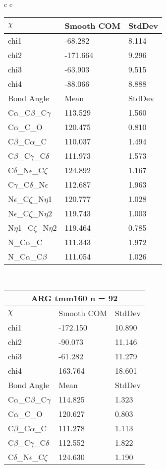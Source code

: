 \begin{longtable}{ c c }
\begin{tabular}{ l l l }
  $\chi$       & Smooth COM & StdDev \\ \midrule
  chi1 & -68.282 & 8.114 \\ 
  chi2 & -171.664 & 9.296 \\ 
  chi3 & -63.903 & 9.515 \\ 
  chi4 & -88.066 & 8.888 \\ \midrule
  Bond Angle   & Mean     & StdDev \\ \midrule
  C$\alpha$\_C$\beta$\_C$\gamma$ & 113.529 & 1.560\\
  C$\alpha$\_C\_O & 120.475 & 0.810\\
  C$\beta$\_C$\alpha$\_C & 110.037 & 1.494\\
  C$\beta$\_C$\gamma$\_C$\delta$ & 111.973 & 1.573\\
  C$\delta$\_N$\epsilon$\_C$\zeta$ & 124.892 & 1.167\\
  C$\gamma$\_C$\delta$\_N$\epsilon$ & 112.687 & 1.963\\
  N$\epsilon$\_C$\zeta$\_N$\eta$1 & 120.777 & 1.028\\
  N$\epsilon$\_C$\zeta$\_N$\eta$2 & 119.743 & 1.003\\
  N$\eta$1\_C$\zeta$\_N$\eta$2 & 119.464 & 0.785\\
  N\_C$\alpha$\_C & 111.343 & 1.972\\
  N\_C$\alpha$\_C$\beta$ & 111.054 & 1.026\\
  \bottomrule
  \end{tabular}
  \\
  \begin{tabular}{ l l l }
  \toprule
  \multicolumn{3}{c}{ARG \textbf{tmm160} n = 92} \\ \toprule
  $\chi$       & Smooth COM & StdDev \\ \midrule
  chi1 & -172.150 & 10.890 \\ 
  chi2 & -90.073 & 11.146 \\ 
  chi3 & -61.282 & 11.279 \\ 
  chi4 & 163.764 & 18.601 \\ \midrule
  Bond Angle   & Mean     & StdDev \\ \midrule
  C$\alpha$\_C$\beta$\_C$\gamma$ & 114.825 & 1.323\\
  C$\alpha$\_C\_O & 120.627 & 0.803\\
  C$\beta$\_C$\alpha$\_C & 111.278 & 1.113\\
  C$\beta$\_C$\gamma$\_C$\delta$ & 112.552 & 1.822\\
  C$\delta$\_N$\epsilon$\_C$\zeta$ & 124.630 & 1.190\\

\end{tabular}
\end{longtable}
